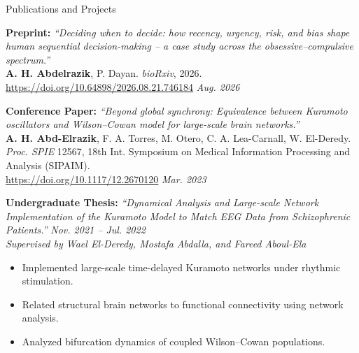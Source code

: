 \documentclass{resume} %
\begin{document}
\begin{rSection}{Publications and Projects}

{\bf Preprint:} \textit{``Deciding when to decide: how recency, urgency, risk, and bias shape human sequential decision-making -- a case study across the obsessive--compulsive spectrum.''} \\
\textbf{A. H. Abdelrazik}, P. Dayan. \textit{bioRxiv}, 2026. \url{https://doi.org/10.64898/2026.08.21.746184} \hfill {\em Aug. 2026}

{\bf Conference Paper:} \textit{``Beyond global synchrony: Equivalence between Kuramoto oscillators and Wilson--Cowan model for large-scale brain networks.''} \\
\textbf{A. H. Abd-Elrazik}, F. A. Torres, M. Otero, C. A. Lea-Carnall, W. El-Deredy. \\
\textit{Proc. SPIE} 12567, 18th Int. Symposium on Medical Information Processing and Analysis (SIPAIM). \\
\url{https://doi.org/10.1117/12.2670120} \hfill {\em Mar. 2023}

{\bf Undergraduate Thesis:} \textit{``Dynamical Analysis and Large-scale Network Implementation of the Kuramoto Model to Match EEG Data from Schizophrenic Patients.''} \hfill {\em Nov. 2021 -- Jul. 2022} \\
\textit{Supervised by Wael El-Deredy, Mostafa Abdalla, and Fareed Aboul-Ela}
\begin{itemize}
    \item Implemented large-scale time-delayed Kuramoto networks under rhythmic stimulation.
    \item Related structural brain networks to functional connectivity using network analysis.
    \item Analyzed bifurcation dynamics of coupled Wilson--Cowan populations.
\end{itemize}

\end{rSection}

\end{document}

